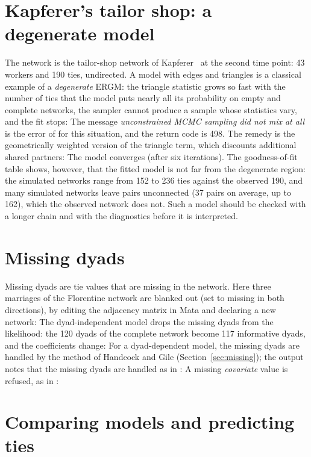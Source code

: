 \section{Kapferer's tailor shop: a degenerate model}\label{sec:kapferer}

The network is the tailor-shop network of Kapferer~\cite{kapferer1972} at the second time point: 43 workers and 190 ties, undirected. A model with edges and triangles is a classical example of a \emph{degenerate} ERGM: the triangle statistic grows so fast with the number of ties that the model puts nearly all its probability on empty and complete networks, the sampler cannot produce a sample whose statistics vary, and the fit stops:
The message \emph{unconstrained MCMC sampling did not mix at all} is the error of \ergm{} for this situation, and the return code is 498. The remedy is the geometrically weighted version of the triangle term, which discounts additional shared partners:
The model converges (after six iterations). The goodness-of-fit table shows, however, that the fitted model is not far from the degenerate region: the simulated networks range from 152 to 236 ties against the observed 190, and many simulated networks leave pairs unconnected (37 pairs on average, up to 162), which the observed network does not.
Such a model should be checked with a longer chain and with the diagnostics before it is interpreted.

\section{Missing dyads}\label{sec:missingex}

Missing dyads are tie values that are missing in the network. Here three marriages of the Florentine network are blanked out (set to missing in both directions), by editing the adjacency matrix in Mata and declaring a new network:
The dyad-independent model drops the missing dyads from the likelihood: the 120 dyads of the complete network become 117 informative dyads, and the coefficients change:
For a dyad-dependent model, the missing dyads are handled by the method of Handcock and Gile (Section~\ref{sec:missing}); the output notes that the missing dyads are handled as in \ergm{}:
A missing \emph{covariate} value is refused, as in \ergm{}:

\section{Comparing models and predicting ties}\label{sec:comparing}

